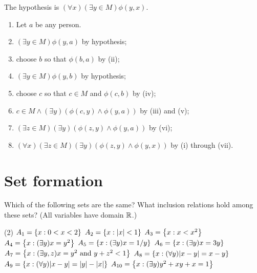 \begin{solution}
The hypothesis is $(\forall x)(\exists y\in M)\phi(y, x)$.

\begin{enumerate}[label=(\roman*)]
    \item Let $a$ be any person.
    \item \quad $(\exists y\in M)\phi(y, a)$ \hfill by hypothesis;
    \item \quad choose $b$ so that $\phi(b,a)$ \hfill by (ii);
    \item \quad $(\exists y\in M)\phi(y, b)$ \hfill by hypothesis;
    \item \quad choose $c$ so that $c\in M$ and $\phi(c,b)$ \hfill by (iv);
    \item \quad $c\in M\land (\exists y)(\phi(c, y)\land \phi(y, a))$ \hfill by (iii) and (v);
    \item \quad $(\exists z\in M)(\exists y)(\phi(z,y)\land \phi(y, a))$ \hfill by (vi);
    \item $(\forall x)(\exists z\in M)(\exists y)(\phi(z,y)\land \phi(y, x))$ \hfill by (i) through (vii).
\end{enumerate}
\end{solution}

\section{Set formation}

\begin{exercise}
Which of the following sets are the same? What inclusion relations hold among
these sets? (All variables have domain $\mathbb{R}$.)

\begin{tasks}[label=](2)
    \task $A_1=\left\{ x : 0 < x <2 \right\}$
    \task $A_2=\left\{ x : \left\lvert x\right\rvert < 1 \right\}$
    \task $A_3=\left\{ x : x < x^2 \right\}$
    \task $A_4=\left\{ x : (\exists y)x=y^2 \right\}$
    \task $A_5=\left\{ x : (\exists y)x=1/y \right\}$
    \task $A_6=\left\{ x : (\exists y)x=3y \right\}$
    \task $A_7=\left\{ x : (\exists y,z)x=y^2 \text{ and } y+z^2 < 1 \right\}$
    \task $A_8=\setb{x}{(\forall y)\abs{x-y} = x - y}$
    \task $A_9=\setb{x}{(\forall y)\abs{x-y} = \abs{y} - \abs{x}}$
    \task $A_{10}=\left\{ x : (\exists y)y^2 + xy + x = 1 \right\}$
\end{tasks}
\end{exercise}

